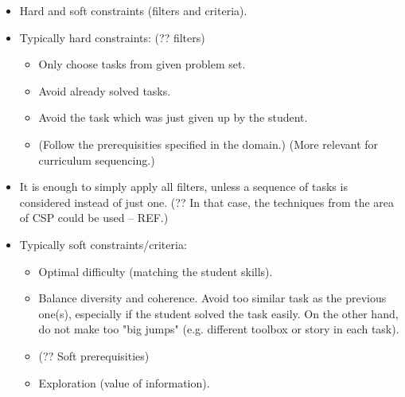 \begin{itemize}
\item Hard and soft constraints (filters and criteria).
\item Typically hard constraints: (?? filters)
\begin{itemize}
\item Only choose tasks from given problem set.
\item Avoid already solved tasks.
\item Avoid the task which was just given up by the student.
\item (Follow the prerequisities specified in the domain.)
  (More relevant for curriculum sequencing.)
\end{itemize}
\item It is enough to simply apply all filters, unless a sequence of tasks is
  considered instead of just one. (?? In that case, the techniques from the area
  of CSP could be used -- REF.)
\item Typically soft constraints/criteria:
\begin{itemize}
\item Optimal difficulty (matching the student skills).
\item Balance diversity and coherence.
  Avoid too similar task as the previous one(s),
  especially if the student solved the task easily.
  On the other hand, do not make too "big jumps" (e.g. different toolbox or
  story in each task).
\item (?? Soft prerequisities)
\item Exploration (value of information).
\end{itemize}


\end{itemize}
